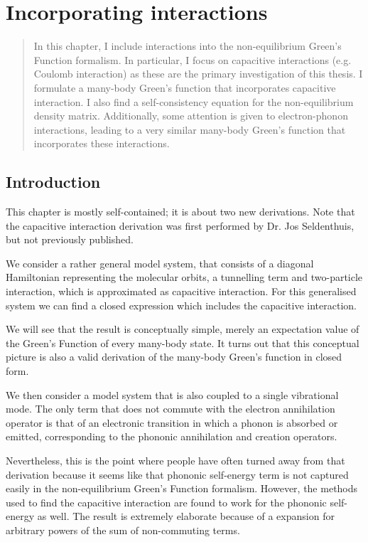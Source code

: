 \chapter{Incorporating interactions}
\label{ch:chapter_3}

\begin{abstract}
In this chapter, I include interactions into the non-equilibrium Green's Function formalism. In particular, I focus on capacitive interactions (e.g. Coulomb interaction) as these are the primary investigation of this thesis. I formulate a many\hyp{}body Green's function that incorporates capacitive interaction. I also find a self-consistency equation for the non-equilibrium density matrix. Additionally, some attention is given to electron-phonon interactions, leading to a very similar many-body Green's function that incorporates these interactions.
\end{abstract}

\newpage
\section{Introduction}
This chapter is mostly self-contained; it is about two new derivations. Note that the capacitive interaction derivation was first performed by Dr. Jos Seldenthuis, but not previously published.

We consider a rather general model system, that consists of a diagonal Hamiltonian representing the molecular orbits, a tunnelling term and  two-particle interaction, which is approximated as capacitive interaction. For this generalised system we can find a closed expression which includes the capacitive interaction.

We will see that the result is conceptually simple, merely an expectation value of the Green's Function of every many-body state. It turns out that this conceptual picture is also a valid derivation of the many-body Green's function in closed form.

We then consider a model system that is also coupled to a single vibrational mode. The only term that does not commute with the electron annihilation operator is that of an electronic transition in which a phonon is absorbed or emitted, corresponding to the phononic annihilation and creation operators.

Nevertheless, this is the point where people have often turned away from that derivation because it seems like that phononic self\hyp{}energy term is not captured easily in the non-equilibrium Green's Function formalism. However, the methods used to find the capacitive interaction are found to work for the phononic self-energy as well. The result is extremely elaborate because of a expansion for arbitrary powers of the sum of non-commuting terms. 

